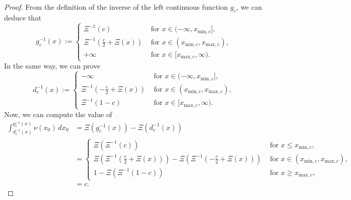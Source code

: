 \documentclass[a4paper, 11pt]{article}
\theoremstyle{definition}
\begin{document}
{\begin{proof}
\noindent	
From the definition of the inverse of the left continuous function $g_c$, we can deduce that
\begin{equation*}
	g^{-1}_c(x):=\begin{cases}
		\Xi^{-1}(c) & \text{ for $x\in (-\infty, x_{\text{min},c}]$,}
		\\
		\Xi^{-1}\left(\frac{c}{2}+\Xi(x)\right) &\text{ for $x\in (x_{\text{min},c},x_{\text{max},c})$,}
		\\
		+\infty & \text{ for $x\in [x_{\text{max},c},\infty)$.}
	\end{cases}
\end{equation*}	
In the same way, we can prove	
\begin{equation*}
	d_c^{-1}(x):=\begin{cases}
		-\infty &\text{ for $x \in (-\infty, x_{\text{min},c}]$,}
		\\		
		\Xi^{-1}\left(-\frac{c}{2}+\Xi(x)\right) &\text{ for $x\in (x_{\text{min},c},x_{\text{max},c})$,}
		\\
		\Xi^{-1}(1-c) &\text{ for $x\in [x_{\text{max},c},\infty )$.}
	\end{cases}
\end{equation*}
Now, we can compute the value of
\begin{align*}
	 \int_{d_c^{-1}(x)}^{g_c^{-1}(x)}\nu(x_0) \, dx_0&=
	 \Xi(g_c^{-1}(x)) - \Xi(d_c^{-1}(x))
	 \\&=\begin{cases*}
	 \Xi(\Xi^{-1}(c)) &\text{ for $x \le x_{\text{min},c}$,}
	 \\
	 \Xi( \Xi^{-1}\left(\frac{c}{2}+\Xi(x)\right) ) -
	 \Xi( \Xi^{-1}\left(-\frac{c}{2}+\Xi(x)\right) ) 
	 &\text{ for $x\in (x_{\text{min},c},x_{\text{max},c})$,}
	 \\	
	 1-\Xi(\Xi^{-1}(1-c)) &\text{ for $x\ge x_{\text{max},c}$,}	
	 \end{cases*}
	 \\
	 &=c.
\end{align*}		
\end{proof}




}
\end{document}
